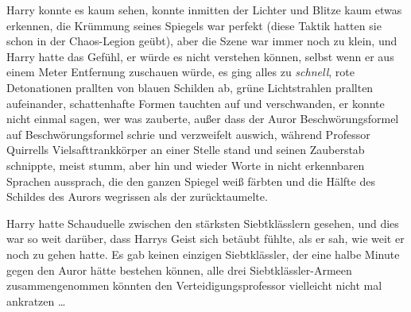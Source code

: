 Harry konnte es kaum sehen, konnte inmitten der Lichter und Blitze kaum etwas erkennen, die Krümmung seines Spiegels war perfekt (diese Taktik hatten sie schon in der Chaos-Legion geübt), aber die Szene war immer noch zu klein, und Harry hatte das Gefühl, er würde es nicht verstehen können, selbst wenn er aus einem Meter Entfernung zuschauen würde, es ging alles zu \emph{schnell}, rote Detonationen prallten von blauen Schilden ab, grüne Lichtstrahlen prallten aufeinander, schattenhafte Formen tauchten auf und verschwanden, er konnte nicht einmal sagen, wer was zauberte, außer dass der Auror Beschwörungsformel auf Beschwörungsformel schrie und verzweifelt auswich, während Professor Quirrells Vielsafttrankkörper an einer Stelle stand und seinen Zauberstab schnippte, meist stumm, aber hin und wieder Worte in nicht erkennbaren Sprachen aussprach, die den ganzen Spiegel weiß färbten und die Hälfte des Schildes des Aurors wegrissen als der zurücktaumelte.

Harry hatte Schauduelle zwischen den stärksten Siebtklässlern gesehen, und dies war so weit darüber, dass Harrys Geist sich betäubt fühlte, als er sah, wie weit er noch zu gehen hatte. Es gab keinen einzigen Siebtklässler, der eine halbe Minute gegen den Auror hätte bestehen können, alle drei Siebtklässler-Armeen zusammengenommen könnten den Verteidigungsprofessor vielleicht nicht mal ankratzen …

